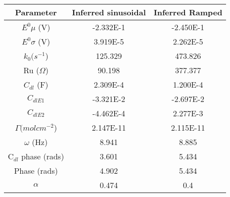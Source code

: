 \documentclass[preview]{standalone}
\begin{document}
\begin{center}
\begin{tabular}{|c|c|c|}
\hline
Parameter & Inferred sinusoidal & Inferred Ramped\\
\hline\hline
$E^0 \mu$ (V) & -2.332E-1 & -2.450E-1 \\
\hline
$E^0 \sigma$ (V) & 3.919E-5 & 2.262E-5 \\
\hline
$k_0 (s^{-1}$) & 125.329 & 473.826 \\
\hline
Ru ($\Omega$) & 90.198 & 377.377 \\
\hline
$C_{dl}$ (F) & 2.309E-4 & 1.200E-4 \\
\hline
$C_{dlE1}$& -3.321E-2 & -2.697E-2 \\
\hline
$C_{dlE2}$& -4.462E-4 & 2.277E-3 \\
\hline
$\Gamma (mol cm^{-2}$) & 2.147E-11 & 2.115E-11 \\
\hline
$\omega$ (Hz) & 8.941 & 8.885 \\
\hline
C$_{dl}$ phase (rads) & 3.601 & 5.434 \\
\hline
Phase (rads) & 4.902 & 5.434 \\
\hline
$\alpha$& 0.474 & 0.4 \\
\hline
\end{tabular}
\end{center}
\end{document}
